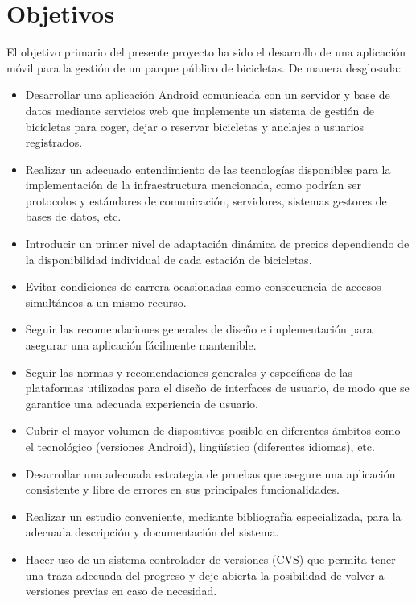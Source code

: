\chapter{Objetivos}
\label{ch:objetivos}

El objetivo primario del presente proyecto ha sido el desarrollo de una aplicación móvil para la gestión de un parque público de bicicletas. De manera desglosada:

\begin{itemize}  
	\item Desarrollar una aplicación Android comunicada con un servidor y base de datos mediante servicios web que implemente un sistema de gestión de bicicletas para coger, dejar o reservar bicicletas y anclajes a usuarios registrados.
	\item Realizar un adecuado entendimiento de las tecnologías disponibles para la implementación de la infraestructura mencionada, como podrían ser protocolos y estándares de comunicación, servidores, sistemas gestores de bases de datos, etc.
	\item Introducir un primer nivel de adaptación dinámica de precios dependiendo de la disponibilidad individual de cada estación de bicicletas.
	\item Evitar condiciones de carrera ocasionadas como consecuencia de accesos simultáneos a un mismo recurso.
	\item Seguir las recomendaciones generales de diseño e implementación para asegurar una aplicación fácilmente mantenible.
	\item Seguir las normas y recomendaciones generales y específicas de las plataformas utilizadas para el diseño de interfaces de usuario, de modo que se garantice una adecuada experiencia de usuario.
	\item Cubrir el mayor volumen de dispositivos posible en diferentes ámbitos como el tecnológico (versiones Android), lingüístico (diferentes idiomas), etc.
	\item Desarrollar una adecuada estrategia de pruebas que asegure una aplicación consistente y libre de errores en sus principales funcionalidades.
	\item Realizar un estudio conveniente, mediante bibliografía especializada, para la adecuada descripción y documentación del sistema.
	\item Hacer uso de un sistema controlador de versiones (CVS) que permita tener una traza adecuada del progreso y deje abierta la posibilidad de volver a versiones previas en caso de necesidad.
\end{itemize}


